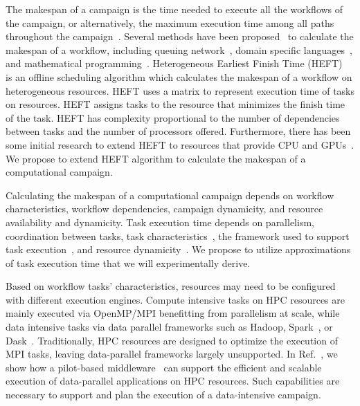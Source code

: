 The makespan of a campaign is the time needed to execute all the workflows of the campaign, or alternatively, the maximum execution time among all paths throughout the campaign~\cite{chirkin2017execution}. Several methods have been proposed~\cite{lu2019review} to calculate the makespan of a workflow, including queuing network~\cite{yao2019throughput,bao2019performance}, domain specific languages~\cite{carothers2017durango,maheshwari2016workflow}, and mathematical programming~\cite{liu2017mathematical}. Heterogeneous Earliest Finish Time (HEFT)~\cite{topcuoglu2002performance} is an offline scheduling algorithm which calculates the makespan of a workflow on heterogeneous resources. HEFT uses a matrix to represent execution time of tasks on resources. HEFT assigns tasks to the resource that minimizes the finish time of the task. HEFT has complexity proportional to the number of dependencies between tasks and the number of processors offered. Furthermore, there has been some initial research to extend HEFT to resources that provide CPU and GPUs~\cite{shetti2013optimization}. We propose to extend HEFT algorithm to calculate the makespan of a computational campaign.


Calculating the makespan of a computational campaign depends on workflow characteristics, workflow dependencies, campaign dynamicity, and resource availability and dynamicity. Task execution time depends on parallelism, coordination between tasks, task characteristics~\cite{khoshlessan2017parallel}, the framework used to support task execution~\cite{paraskevakos2018task}, and resource dynamicity~\cite{paraskevakos2019workflow}. We propose to utilize approximations of task execution time that we will experimentally derive.


Based on workflow tasks’ characteristics, resources may need to be configured with different execution engines. Compute intensive tasks on HPC resources are mainly executed via OpenMP/MPI benefitting from parallelism at scale, while data intensive tasks via data parallel frameworks such as Hadoop, Spark~\cite{zaharia2010spark}, or Dask~\cite{rocklin2015dask}. Traditionally, HPC resources are designed to optimize the execution of MPI tasks, leaving data-parallel frameworks largely unsupported. In Ref.~\cite{luckow2016hadoop}, we show how a pilot-based middleware~\cite{merzky2019using} can support the efficient and scalable execution of data-parallel applications on HPC resources. Such capabilities are necessary to support and plan the execution of a data-intensive campaign.


